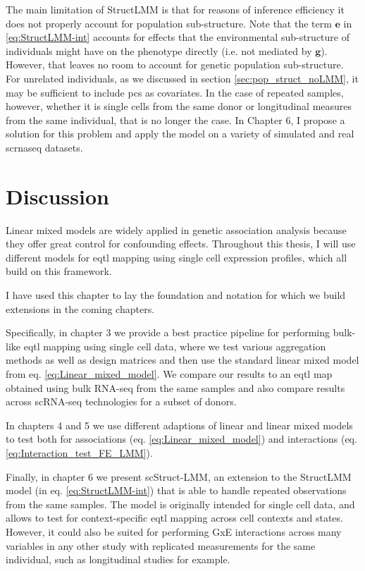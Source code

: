 The main limitation of StructLMM is that for reasons of inference efficiency it does not properly account for population sub-structure.
Note that the term $\mathbf{e}$ in \eqref{eq:StructLMM-int} accounts for effects that the environmental sub-structure of individuals might have on the phenotype directly (i.e. not mediated by $\mathbf{g}$).
However, that leaves no room to account for genetic population sub-structure.
For unrelated individuals, as we discussed in section \ref{sec:pop_struct_noLMM}, it may be sufficient to include \gls{pc}s as covariates.
In the case of repeated samples, however, whether it is single cells from the same donor or longitudinal measures from the same individual, that is no longer the case.
In Chapter 6, I propose a solution for this problem and apply the model on a variety of simulated and real \gls{scrnaseq} datasets.



\section{Discussion}

Linear mixed models are widely applied in genetic association analysis because they offer great control for confounding effects.
Throughout this thesis, I will use different models for \gls{eqtl} mapping using single cell expression profiles, which all build on this framework.

I have used this chapter to lay the foundation and notation for which we build extensions in the coming chapters.

Specifically, in chapter 3 we provide a best practice pipeline for performing bulk-like \gls{eqtl} mapping using single cell data, where we test various aggregation methods as well as design matrices and then use the standard linear mixed model from eq. \eqref{eq:Linear_mixed_model}.
We compare our results to an \gls{eqtl} map obtained using bulk RNA-seq from the same samples and also compare results across scRNA-seq technologies for a subset of donors.

In chapters 4 and 5 we use different adaptions of linear and linear mixed models to test both for associations (eq. \eqref{eq:Linear_mixed_model}) and interactions (eq. \eqref{eq:Interaction_test_FE_LMM}). 

Finally, in chapter 6 we present scStruct-LMM, an extension to the StructLMM model (in eq. \eqref{eq:StructLMM-int}) that is able to handle repeated observations from the same samples.
The model is originally intended for single cell data, and allows to test for context-specific \gls{eqtl} mapping across cell contexts and states.
However, it could also be suited for performing GxE interactions across many variables in any other study with replicated measurements for the same individual, such as longitudinal studies for example.